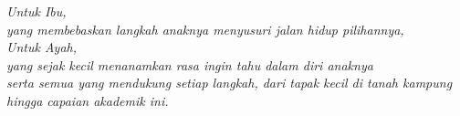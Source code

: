 \acknowledgment
\begin{centering}
\vfill
\emph{Untuk Ibu,\\yang membebaskan langkah anaknya menyusuri jalan hidup pilihannya,\\ Untuk Ayah,\\ yang sejak kecil menanamkan rasa ingin tahu dalam diri anaknya\\serta semua yang mendukung setiap langkah, dari tapak kecil di tanah kampung hingga capaian akademik ini.\\[.5cm]}
\vfill
\end{centering}
